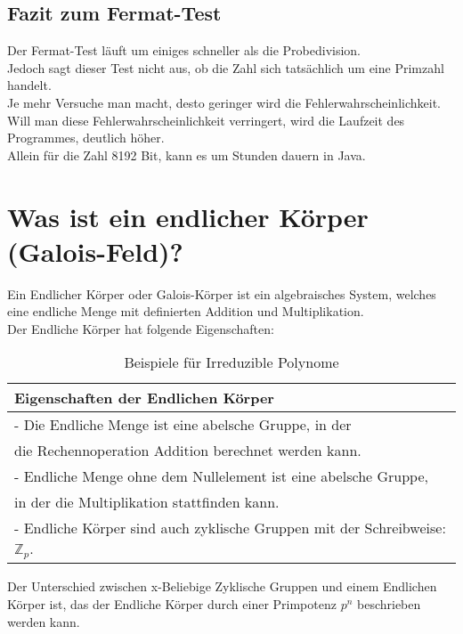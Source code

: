 \subsection*{Fazit zum Fermat-Test}

Der Fermat-Test läuft um einiges schneller als die Probedivision.\\
Jedoch sagt dieser Test nicht aus, ob die Zahl sich tatsächlich um eine Primzahl handelt.\\
Je mehr Versuche man macht, desto geringer wird die Fehlerwahrscheinlichkeit. \\
Will man diese Fehlerwahrscheinlichkeit verringert, wird die Laufzeit des Programmes, deutlich höher.  \\
Allein für die Zahl 8192 Bit, kann es um Stunden dauern in Java. 


\newpage
\section{Was ist ein endlicher Körper (Galois-Feld)?}

Ein Endlicher Körper oder Galois-Körper ist ein algebraisches System, welches eine endliche Menge mit definierten Addition und Multiplikation.\\
Der Endliche Körper hat folgende Eigenschaften:


\begin{table}[!ht]
    \centering
        \begin{tabular}{l}
            \toprule
            \textbf{Eigenschaften der Endlichen Körper}\\
            \midrule
            - Die Endliche Menge ist eine abelsche Gruppe, in der \\
            die Rechennoperation Addition berechnet werden kann.\\
            - Endliche Menge ohne dem Nullelement ist eine abelsche Gruppe, \\
            in der die Multiplikation stattfinden kann.\\
            - Endliche Körper sind auch zyklische Gruppen mit der Schreibweise: $ \mathbb{Z}_p $. \\
           \bottomrule
        \end{tabular}
        \caption{Beispiele für Irreduzible Polynome}
        \label{tab3}
    \end{table}

Der Unterschied zwischen x-Beliebige Zyklische Gruppen und einem Endlichen Körper ist, das der Endliche Körper durch einer Primpotenz $ p^n $ beschrieben werden kann.

